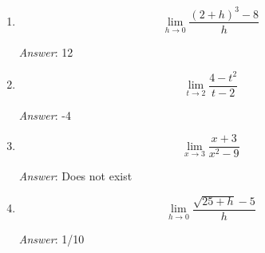 \documentclass[12pt,reqno]{article}
\theoremstyle{definition}
\begin{document}
\begin{enumerate}
		\begin{enumerate}
		
		\item \[\lim_{h\rightarrow 0}\frac{(2+h)^3-8}{h}\]
		
		
		{\em Answer}: 12 \\
		
		\item \[\lim_{t\rightarrow 2}\frac{4-t^2}{t-2}\]
		
		{\em Answer}:  -4\\
		
		\item \[\lim_{x\rightarrow 3}\frac{x+3}{x^2-9}\]
		
		{\em Answer}: Does not exist \\
		
		\item \[\lim_{h\rightarrow 0}\frac{\sqrt{25+h}-5}{h}\]
		
		
		{\em Answer}: 1/10 \\
		
		\end{enumerate}
		
	\end{enumerate}
	
	
	
	
	
	
	
\end{document}
